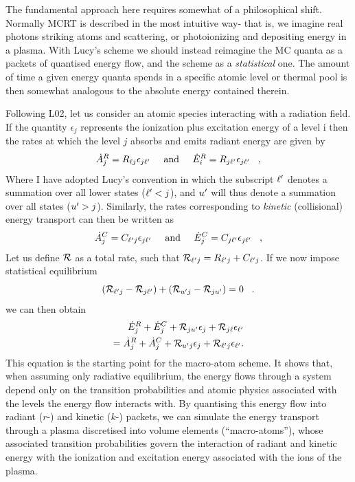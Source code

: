 The fundamental approach here requires somewhat of a philosophical shift.
Normally MCRT is described in the most intuitive way- that is, we imagine
real photons striking atoms and scattering, or photoionizing 
and depositing energy in a plasma. With Lucy's scheme we should instead 
reimagine the MC quanta as a packets of quantised energy flow, and the scheme as a 
{\em statistical} one. The amount of time a given energy quanta spends in a specific atomic
level or thermal pool is then somewhat analogous to the absolute energy 
contained therein.

Following L02, let us consider an atomic species interacting with a radiation field.
If the quantity $\epsilon_j$ represents the ionization plus excitation energy of 
a level i then the rates at which the level $j$ absorbs and emits radiant energy 
are given by
\begin{equation}
 \dot{A}_{j}^{R} = R_{\ell j} \epsilon_{j {\ell^\prime}} \;\;\;\;\; {\rm and} \;\;\;
\;\;  \dot{E}_{i}^{R} = R_{j {\ell^\prime}} \epsilon_{j {\ell^\prime}} \;\;\; ,
\end{equation}
Where I have adopted Lucy's convention in which the subscript 
${\ell^\prime}$ denotes a summation over all lower states (${\ell^\prime}<j$), and
${u^\prime}$ will thus denote a summation over all states (${u^\prime}>j$).
Similarly, the rates corresponding to {\em kinetic} (collisional)
energy transport can then be written as
\begin{equation}
 \dot{A}_{j}^{C} = C_{{\ell^\prime} j} \epsilon_{j {\ell^\prime}} \;\;\;\;\; {\rm and}
\;\;\;
\;\;  \dot{E}_{j}^{C} = C_{j {\ell^\prime}} \epsilon_{j {\ell^\prime}} \;\;\; ,
\end{equation}
Let us define ${\cal R}$ as a total rate, such that
${\cal R}_{{\ell^\prime} j}  = R_{{\ell^\prime} j} + C_{{\ell^\prime} j}$.
If we now impose statistical equilibrium
%
\begin{equation}
 ({\cal R}_{{\ell^\prime} j}-{\cal R}_{j {\ell^\prime}})+({\cal R}_{{u^\prime} j}-{\cal R}_{j{u^\prime}})=0 \;\;\;.
\end{equation}
we can then obtain 
\begin{eqnarray}
 \dot{E}_{j}^{R}+\dot{E}_{j}^{C}+{\cal R}_{j{u^\prime}}\epsilon_{j}+
 {\cal R}_{j \ell}\epsilon_{{\ell^\prime}}  \nonumber \\  
 = \dot{A}_{j}^{R}+\dot{A}_{j}^{C}+{\cal R}_{{u^\prime} j} \epsilon_{j}
 +{\cal R}_{{\ell^\prime} j} \epsilon_{{\ell^\prime}}           .  
 \label{eq:matom_SE}     
\end{eqnarray}
This equation is the starting point for the macro-atom scheme. It shows 
that, when assuming only radiative equilibrium, the energy flows through
a system depend only on the transition probabilities and atomic physics
associated with the levels the energy flow interacts with.
By quantising this energy flow into radiant ($r$-) and kinetic ($k$-) packets, 
we can simulate the energy transport through
a plasma discretised into volume elements (``macro-atoms''),
whose associated transition probabilities govern the interaction 
of radiant and kinetic energy with the ionization and excitation energy associated 
with the ions of the plasma.

